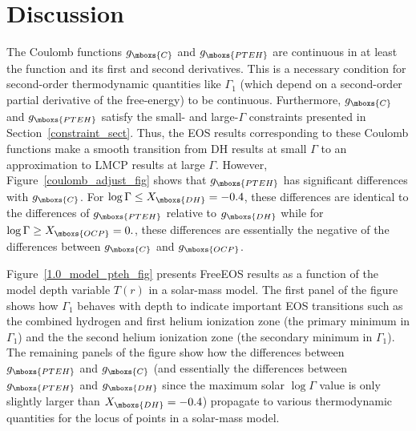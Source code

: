 \section{Discussion }

The Coulomb functions $g_{\mboxs{C}}$ and $g_{\mboxs{PTEH}}$ are continuous
in at least the function and its first and second derivatives.  This is a
necessary condition for second-order thermodynamic quantities like
$\Gamma_1$ (which depend on a second-order partial derivative of the
free-energy) to be continuous.  Furthermore, $g_{\mboxs{C}}$ and
$g_{\mboxs{PTEH}}$ satisfy the small- and large-$\Gamma$ constraints
presented in Section~\ref{constraint_sect}. Thus, the EOS results
corresponding to these Coulomb functions make a smooth transition from DH
results at small $\Gamma$ to an approximation to LMCP results at large
$\Gamma$.  However, Figure~\ref{coulomb_adjust_fig} shows that
$g_{\mboxs{PTEH}}$ has significant differences with $g_{\mboxs{C}}$. For
$\log \Gamma \le X_{\mboxs{DH}} = -0.4$, these differences are identical to the
differences of $g_{\mboxs{PTEH}}$ relative to $g_{\mboxs{DH}}$ while for
$\log \Gamma \ge X_{\mboxs{OCP}} = 0.$, these differences are essentially the
negative of the differences between $g_{\mboxs{C}}$ and $g_{\mboxs{OCP}}$.

Figure~\ref{1.0_model_pteh_fig} presents FreeEOS results as a function of
the model depth variable $T(r)$ in a solar-mass model. The first panel of
the figure shows how $\Gamma_1$ behaves with depth to indicate important EOS
transitions such as the combined hydrogen and first helium ionization zone
(the primary minimum in $\Gamma_1$) and the the second helium ionization
zone (the secondary minimum in $\Gamma_1$).  The remaining panels of the
figure show how the differences between $g_{\mboxs{PTEH}}$ and
$g_{\mboxs{C}}$ (and essentially the differences between $g_{\mboxs{PTEH}}$
and $g_{\mboxs{DH}}$ since the maximum solar $\log \Gamma$ value is only
slightly larger than $X_{\mboxs{DH}} = -0.4$) propagate to various
thermodynamic quantities for the locus of points in a solar-mass model.

